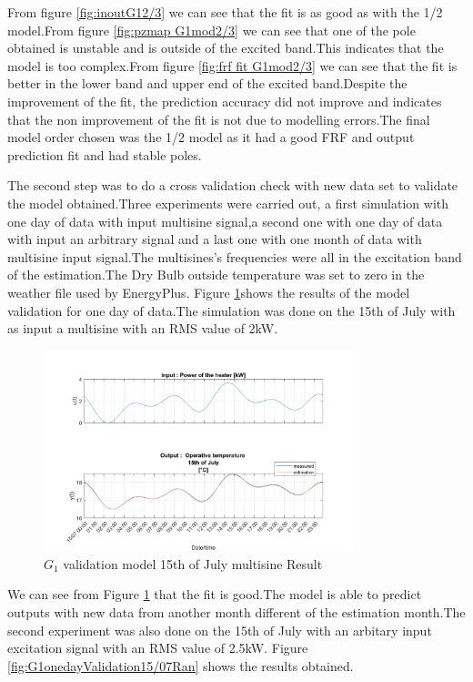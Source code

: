 \documentclass[a4paper,12pt]{report}
\numberwithin{equation}{section}
\begin{document}
\noindent
From figure \ref{fig:inoutG12/3} we can see that the fit is as good as with the 1/2 model.From figure \ref{fig:pzmap G1mod2/3} we can see that one of the pole obtained is unstable and is outside of the excited band.This indicates that the model is too complex.From figure \ref{fig:frf fit G1mod2/3} we can see that the fit is better in the lower band and upper end of the excited band.Despite the improvement of the fit, the prediction accuracy did not improve and indicates that the non improvement of the fit is not due to modelling errors.The final model order chosen was the 1/2 model as it had a good FRF and output prediction fit and had stable poles.

The second step was to do a cross validation check with new data set to validate the model obtained.Three  experiments were carried out, a first simulation with one day of data with input multisine signal,a second one with one day of data with input an arbitrary signal and a last one with one month of data with multisine input signal.The multisines's frequencies were all in the excitation band of the estimation.The Dry Bulb outside temperature was set to zero in the weather file used by EnergyPlus. Figure \ref{fig:G1onedayValidation15/07}shows the results of the model validation for one day of data.The simulation was done on the 15th of July with as input a multisine with an RMS value of 2kW.

\begin{figure}[H]
    \includegraphics[scale=0.8,width=0.8\textwidth]{G1_15_07_MS.png}
    \centering
    \caption{$G_{1}$ validation model 15th of July multisine Result}
    \label{fig:G1onedayValidation15/07}
\end{figure}

\noindent
We can see from Figure \ref{fig:G1onedayValidation15/07} that the fit is good.The model is able to predict outputs with new data from another month different of the estimation month.The second experiment was also done on the 15th of July with an arbitary input excitation signal with an RMS value of 2.5kW. Figure \ref{fig:G1onedayValidation15/07Ran} shows the results obtained.
\end{document}
